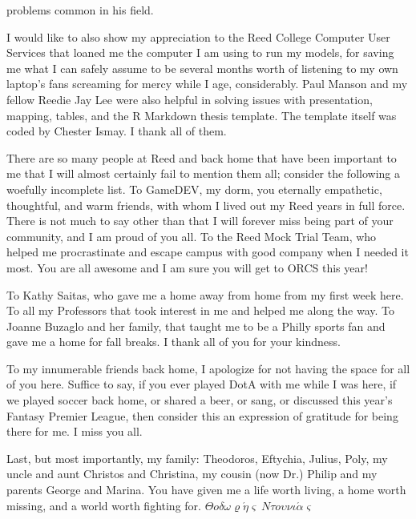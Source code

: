 \documentclass[12pt,twoside]{reedthesis}
\begin{document}
\begin{preface}
      problems common in his field. \par I would like to also show my
      appreciation to the Reed College Computer User Services that loaned me
      the computer I am using to run my models, for saving me what I can
      safely assume to be several months worth of listening to my own laptop's
      fans screaming for mercy while I age, considerably. Paul Manson and my
      fellow Reedie Jay Lee were also helpful in solving issues with
      presentation, mapping, tables, and the R Markdown thesis template. The
      template itself was coded by Chester Ismay. I thank all of them.
      \par There are so many people at Reed and back home that have been
      important to me that I will almost certainly fail to mention them all;
      consider the following a woefully incomplete list. To GameDEV, my dorm,
      you eternally empathetic, thoughtful, and warm friends, with whom I
      lived out my Reed years in full force. There is not much to say other
      than that I will forever miss being part of your community, and I am
      proud of you all. To the Reed Mock Trial Team, who helped me
      procrastinate and escape campus with good company when I needed it most.
      You are all awesome and I am sure you will get to ORCS this year!
      \par To Kathy Saitas, who gave me a home away from home from my first
      week here. To all my Professors that took interest in me and helped me
      along the way. To Joanne Buzaglo and her family, that taught me to be a
      Philly sports fan and gave me a home for fall breaks. I thank all of you
      for your kindness. \par To my innumerable friends back home, I apologize
      for not having the space for all of you here. Suffice to say, if you
      ever played DotA with me while I was here, if we played soccer back
      home, or shared a beer, or sang, or discussed this year's Fantasy
      Premier League, then consider this an expression of gratitude for being
      there for me. I miss you all. \par Last, but most importantly, my
      family: Theodoros, Eftychia, Julius, Poly, my uncle and aunt Christos
      and Christina, my cousin (now Dr.) Philip and my parents George and
      Marina. You have given me a life worth living, a home worth missing, and
      a world worth fighting for.
      \(\Theta o \delta \omega \varrho\acute\eta\varsigma~N\tau o\upsilon \nu \iota \acute{\alpha}\varsigma\)
      \par
    \end{preface}
  
\end{document}
